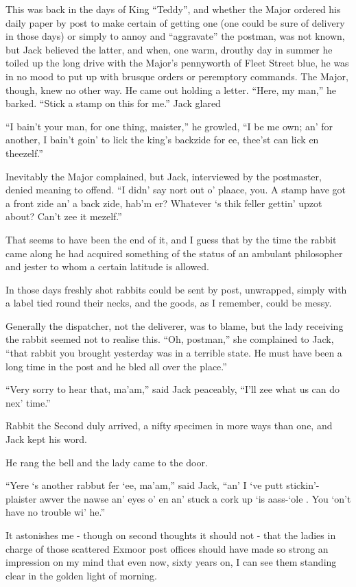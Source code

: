 This was back in the days of King “Teddy”, and whether the Major ordered his daily paper by post to make certain of getting one (one could be sure of delivery in those days) or simply to annoy and “aggravate” the postman, was not known, but Jack believed the latter, and when, one warm, drouthy day in summer he toiled up the long drive with the Major’s pennyworth of Fleet Street blue, he was in no mood to put up with brusque orders or peremptory commands.
 The Major, though, knew no other way. He came out holding a letter.
 “Here, my man,” he barked. “Stick a stamp on this for me.”
 Jack glared

“I bain’t your man, for one thing, maister,” he growled, “I be me own; an’ for another, I bain’t goin’ to lick the king’s backzide for ee, thee’st can lick en theezelf.” 

Inevitably the Major complained, but Jack, interviewed by the postmaster, denied meaning to offend. “I didn’ say nort out o’ plaace, you. A stamp have got a front zide an’ a back zide, hab’m er? Whatever ‘s thik feller gettin’ upzot about? Can’t zee it mezelf.” 	 	

That seems to have been the end of it, and I guess that by the time the rabbit came along he had acquired something of the status of an ambulant philosopher and jester to whom a certain latitude is allowed. 

In those days freshly shot rabbits could be sent by post, unwrapped, simply with a label tied round their necks, and the goods, as I remember, could be messy.

Generally the dispatcher, not the deliverer, was to blame, but the lady receiving the rabbit seemed not to realise this. “Oh, postman,” she complained to Jack, “that rabbit you brought yesterday was in a terrible state. He must have been a long time in the post and he bled all over the place.”

“Very sorry to hear that, ma’am,” said Jack peaceably, “I’ll zee what us can do nex’ time.”

Rabbit the Second duly arrived, a nifty specimen in more ways than one, and Jack kept his word.

He rang the bell and the lady came to the door.

“Yere ‘s another rabbut fer ‘ee, ma’am,” said Jack, “an’ I ‘ve putt stickin’- plaister awver the nawse an’ eyes o’ en an’ stuck a cork up ‘is aass-‘ole . You ‘on’t have no trouble wi’ he.”
 
\Flourish
	
It astonishes me - though on second thoughts it should not - that the ladies in charge of those scattered Exmoor post offices should have made so strong an impression on my mind that even now, sixty years on, I can see them standing clear in the golden light of morning.

